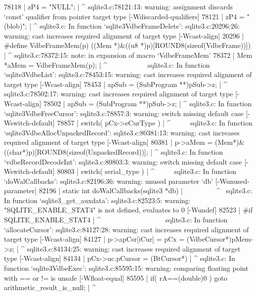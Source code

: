 {{{{{{{{78118 |         zP4 = "NULL";
      |             ^
sqlite3.c:78121:13: warning: assignment discards ‘const’ qualifier from pointer target type [-Wdiscarded-qualifiers]
78121 |         zP4 = "(blob)";
      |             ^
sqlite3.c: In function ‘sqlite3VdbeFrameDelete’:
sqlite3.c:20296:26: warning: cast increases required alignment of target type [-Wcast-align]
20296 | #define VdbeFrameMem(p) ((Mem *)&((u8 *)p)[ROUND8(sizeof(VdbeFrame))])
      |                          ^
sqlite3.c:78372:15: note: in expansion of macro ‘VdbeFrameMem’
78372 |   Mem *aMem = VdbeFrameMem(p);
      |               ^~~~~~~~~~~~
sqlite3.c: In function ‘sqlite3VdbeList’:
sqlite3.c:78453:15: warning: cast increases required alignment of target type [-Wcast-align]
78453 |       apSub = (SubProgram **)pSub->z;
      |               ^
sqlite3.c:78502:17: warning: cast increases required alignment of target type [-Wcast-align]
78502 |         apSub = (SubProgram **)pSub->z;
      |                 ^
sqlite3.c: In function ‘sqlite3VdbeFreeCursor’:
sqlite3.c:78857:3: warning: switch missing default case [-Wswitch-default]
78857 |   switch( pCx->eCurType ){
      |   ^~~~~~
sqlite3.c: In function ‘sqlite3VdbeAllocUnpackedRecord’:
sqlite3.c:80381:13: warning: cast increases required alignment of target type [-Wcast-align]
80381 |   p->aMem = (Mem*)&((char*)p)[ROUND8(sizeof(UnpackedRecord))];
      |             ^
sqlite3.c: In function ‘vdbeRecordDecodeInt’:
sqlite3.c:80803:3: warning: switch missing default case [-Wswitch-default]
80803 |   switch( serial_type ){
      |   ^~~~~~
sqlite3.c: In function ‘doWalCallbacks’:
sqlite3.c:82196:36: warning: unused parameter ‘db’ [-Wunused-parameter]
82196 | static int doWalCallbacks(sqlite3 *db){
      |                           ~~~~~~~~~^~
sqlite3.c: In function ‘sqlite3_get_auxdata’:
sqlite3.c:82523:5: warning: "SQLITE_ENABLE_STAT4" is not defined, evaluates to 0 [-Wundef]
82523 | #if SQLITE_ENABLE_STAT4
      |     ^~~~~~~~~~~~~~~~~~~
sqlite3.c: In function ‘allocateCursor’:
sqlite3.c:84127:28: warning: cast increases required alignment of target type [-Wcast-align]
84127 |     p->apCsr[iCur] = pCx = (VdbeCursor*)pMem->z;
      |                            ^
sqlite3.c:84134:25: warning: cast increases required alignment of target type [-Wcast-align]
84134 |       pCx->uc.pCursor = (BtCursor*)
      |                         ^
sqlite3.c: In function ‘sqlite3VdbeExec’:
sqlite3.c:85595:15: warning: comparing floating point with == or != is unsafe [-Wfloat-equal]
85595 |         if( rA==(double)0 ) goto arithmetic_result_is_null;
      |               ^~
}}}}}}}}}}}
